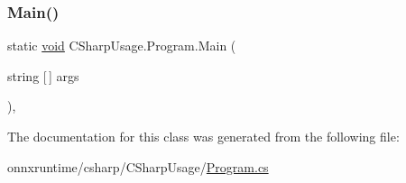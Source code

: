 \subsubsection{\texorpdfstring{Main()}{Main()}\hspace{0.1cm}{\footnotesize\ttfamily [2/2]}}
{\footnotesize\ttfamily static \mbox{\hyperlink{mlasi_8h_a88f941d423cb2a819b70a1358982b1a6}{void}} C\+Sharp\+Usage.\+Program.\+Main (\begin{DoxyParamCaption}\item[{string \mbox{[}$\,$\mbox{]}}]{args }\end{DoxyParamCaption})\hspace{0.3cm}{\ttfamily [inline]}, {\ttfamily [static]}}



The documentation for this class was generated from the following file\+:\begin{DoxyCompactItemize}
\item 
onnxruntime/csharp/\+C\+Sharp\+Usage/\mbox{\hyperlink{CSharpUsage_2Program_8cs}{Program.\+cs}}\end{DoxyCompactItemize}
